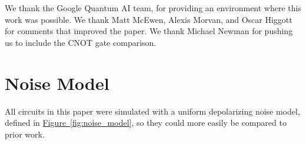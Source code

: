 \documentclass[onecolumn,unpublished,a4paper]{quantumarticle}
\theoremstyle{definition}
\newcommand{\fig}[1]{\hyperref[fig:#1]{Figure~\ref*{fig:#1}}}
\begin{document}
We thank the Google Quantum AI team, for providing an environment where this work was possible.
We thank Matt McEwen, Alexis Morvan, and Oscar Higgott for comments that improved the paper.
We thank Michael Newman for pushing us to include the CNOT gate comparison.

\printbibliography

\appendix

\clearpage
\section{Noise Model}
\label{app:noise-model}

All circuits in this paper were simulated with a uniform depolarizing noise model, defined in \fig{noise_model}, so they could more easily be compared to prior work.
\end{document}
